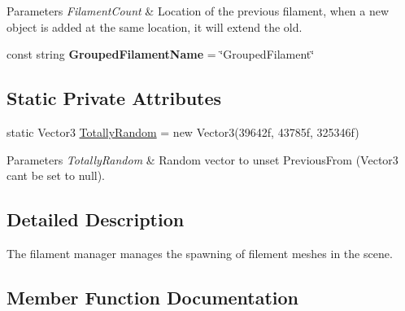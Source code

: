 \begin{DoxyCompactItemize}
\begin{DoxyCompactList}
\begin{DoxyParams}{Parameters}
{\em Filament\+Count} & Location of the previous filament, when a new object is added at the same location, it will extend the old.\\
\hline
\end{DoxyParams}
\end{DoxyCompactList}\item 
\mbox{\label{class_filament_manager_a0b66beb7f8c31aee2c3c03c2917129b4}} 
const string {\bfseries Grouped\+Filament\+Name} = \char`\"{}Grouped\+Filament\char`\"{}
\end{DoxyCompactItemize}
\subsection*{Static Private Attributes}
\begin{DoxyCompactItemize}
\item 
\mbox{\label{class_filament_manager_a0701818c4123f615adeb651037cec8cb}} 
static Vector3 \hyperlink{class_filament_manager_a0701818c4123f615adeb651037cec8cb}{Totally\+Random} = new Vector3(39642f, 43785f, 325346f)
\begin{DoxyCompactList}\small\item\em 
\begin{DoxyParams}{Parameters}
{\em Totally\+Random} & Random vector to unset Previous\+From (Vector3 can\textquotesingle{}t be set to null).\\
\hline
\end{DoxyParams}
\end{DoxyCompactList}\end{DoxyCompactItemize}


\subsection{Detailed Description}
The filament manager manages the spawning of filement meshes in the scene. 



\subsection{Member Function Documentation}
\mbox{\label{class_filament_manager_afda4accf27e892725d2a9974607421b6}} 
